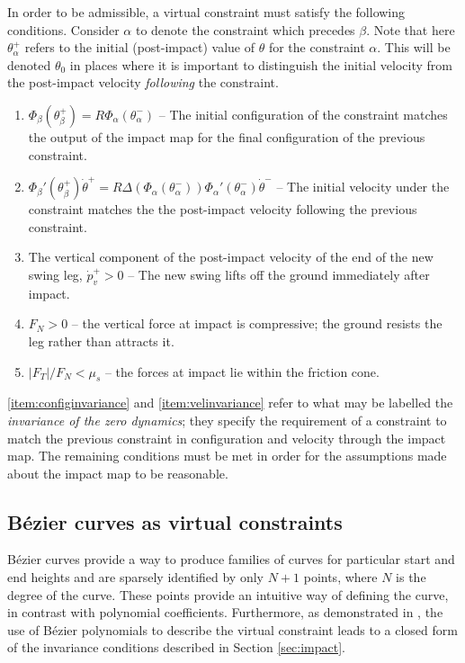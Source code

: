In order to be admissible, a virtual constraint must satisfy the following conditions. Consider $\alpha$ to denote the constraint which precedes $\beta$. Note that here $\theta_\alpha^+$ refers to the initial (post-impact) value of $\theta$ for the constraint $\alpha$. This will be denoted $\theta_0$ in places where it is important to distinguish the initial velocity from the post-impact velocity \textit{following} the constraint.
\begin{samepage}
\begin{adjustwidth}{1.8cm}{}
\begin{enumerate}[label=\bfseries Condition \arabic*, parsep=0pt]
	\item $\Phi_\beta\left(\theta_\beta^+\right) = R\Phi_\alpha\left(\theta_\alpha^-\right)$ -- The initial configuration of the constraint matches the output of the impact map for the final configuration of the previous constraint. \label{item:configinvariance}
	\item $\Phi_\beta'\left(\theta_\beta^+\right)\dot{\theta}^+ = R\Delta\left(\Phi_\alpha(\theta_\alpha^-)\right)\Phi_\alpha'\left(\theta_\alpha^-\right)\dot{\theta}^-$ -- The initial velocity under the constraint matches the the post-impact velocity following the previous constraint. \label{item:velinvariance}
	\item The vertical component of the post-impact velocity of the end of the new swing leg, $\dot{p}_v^+ > 0$ -- The new swing lifts off the ground immediately after impact. \label{item:liftoff}
	\item $F_N > 0$ -- the vertical force at impact is compressive; the ground resists the leg rather than attracts it. \label{item:posnormalF}
	\item $|F_T|/F_N<\mu_s$ -- the forces at impact lie within the friction cone. \label{item:frictioncone}
\end{enumerate}
\end{adjustwidth}
\end{samepage}

\ref{item:configinvariance} and \ref{item:velinvariance} refer to what may be labelled the \textit{invariance of the zero dynamics}; they specify the requirement of a constraint to match the previous constraint in configuration and velocity through the impact map. The remaining conditions must be met in order for the assumptions made about the impact map to be reasonable.

\subsection{B{\'e}zier curves as virtual constraints} \label{sec:bezconstraints}
Bézier curves provide a way to produce families of curves for particular start and end heights and are sparsely identified by only $N+1$ points, where $N$ is the degree of the curve. These points provide an intuitive way of defining the curve, in contrast with polynomial coefficients. Furthermore, as demonstrated in \cite{westervelt2007feedback}, the use of Bézier polynomials to describe the virtual constraint leads to a closed form of the invariance conditions described in Section \ref{sec:impact}. 

